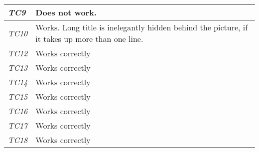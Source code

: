 \begin{minipage}{\linewidth}
\begin{tabular}{ |l|p{70mm}| }
	\it{\cellcolor{gray!25}TC9} & Does not work. \\ \hline
	\it{\cellcolor{gray!25}TC10} & Works. Long title is inelegantly hidden behind the picture, if it takes up more than one line. \\ \hline
	\it{\cellcolor{gray!25}TC12} & Works correctly \\ \hline
	\it{\cellcolor{gray!25}TC13} & Works correctly \\ \hline
	\it{\cellcolor{gray!25}TC14} & Works correctly \\ \hline
	\it{\cellcolor{gray!25}TC15} & Works correctly \\ \hline
	\it{\cellcolor{gray!25}TC16} & Works correctly \\ \hline
	\it{\cellcolor{gray!25}TC17} & Works correctly \\ \hline
	\it{\cellcolor{gray!25}TC18} & Works correctly \\ \hline
\end{tabular}
\medskip
\end{minipage}
%
